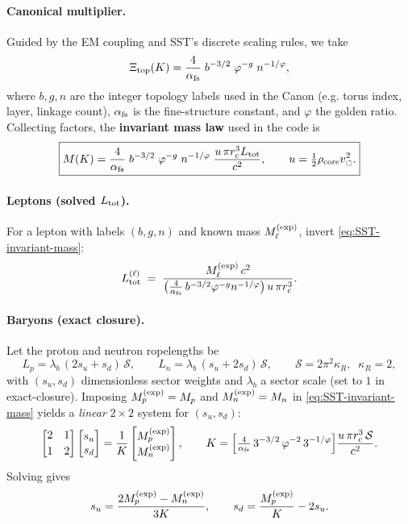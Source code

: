 \documentclass[11pt]{article}
\begin{document}
\paragraph{Canonical multiplier.}
    Guided by the EM coupling and SST’s discrete scaling rules, we take
    \[
        \Xi_{\text{top}}(K)=\frac{4}{\alpha_{\rm fs}}\;b^{-3/2}\;\varphi^{-g}\;n^{-1/\varphi},
    \]
    where $b,g,n$ are the integer topology labels used in the Canon (e.g. torus index, layer, linkage count), $\alpha_{\rm fs}$ is the fine-structure constant, and $\varphi$ the golden ratio. Collecting factors, the \textbf{invariant mass law} used in the code is
    \begin{equation*}
    \boxed{M(K)=\frac{4}{\alpha_{\rm fs}}\;b^{-3/2}\;\varphi^{-g}\;n^{-1/\varphi}\;
    \frac{u\,\pi r_c^3 L_{\rm tot}}{c^2},
        \qquad
        u=\tfrac{1}{2}\rho_{\text{core}}v_{\circlearrowleft}^2.
    }\label{eq:SST-invariant-mass}
    \end{equation*}

\paragraph{Leptons (solved $L_{\rm tot}$).}
    For a lepton with labels $(b,g,n)$ and known mass $M_\ell^{\rm(exp)}$, invert \eqref{eq:SST-invariant-mass}:
    \[
        L_{\rm tot}^{(\ell)} \;=\;
        \frac{M_\ell^{\rm(exp)}\,c^2}{\big(\tfrac{4}{\alpha_{\rm fs}}\,b^{-3/2}\varphi^{-g}n^{-1/\varphi}\big)\,u\,\pi r_c^3}.
    \]

\paragraph{Baryons (exact closure).}
    Let the proton and neutron ropelengths be
    \[
        L_p=\lambda_b\,(2s_u+s_d)\,\mathcal S,\qquad
        L_n=\lambda_b\,(s_u+2s_d)\,\mathcal S,\qquad
        \mathcal S=2\pi^2\kappa_R,\;\;\kappa_R=2,
    \]
    with $(s_u,s_d)$ dimensionless sector weights and $\lambda_b$ a sector scale (set to $1$ in exact-closure).
    Imposing $M_p^{\rm(exp)}=M_p$ and $M_n^{\rm(exp)}=M_n$ in \eqref{eq:SST-invariant-mass} yields a \emph{linear} $2\times2$ system for $(s_u,s_d)$:
    \[
        \begin{bmatrix}
        2 & 1\\[2pt]
        1 & 2
        \end{bmatrix}
        \begin{bmatrix}
        s_u\\ s_d
        \end{bmatrix}
        =
        \frac{1}{K}
        \begin{bmatrix}
        M_p^{\rm(exp)}\\ M_n^{\rm(exp)}
        \end{bmatrix},
        \qquad
        K=\Big[\tfrac{4}{\alpha_{\rm fs}}\,3^{-3/2}\,\varphi^{-2}\,3^{-1/\varphi}\Big]\frac{u\,\pi r_c^3\,\mathcal S}{c^2}.
    \]
    Solving gives
    \[
        s_u=\frac{2M_p^{\rm(exp)}-M_n^{\rm(exp)}}{3K},
        \qquad
        s_d=\frac{M_p^{\rm(exp)}}{K}-2s_u.
    \]
\end{document}
